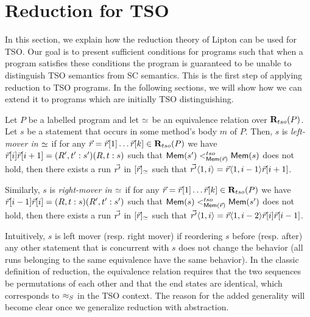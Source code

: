 \section{Reduction for TSO}
\label{sec:reduction-for-tso}
In this section, we explain how the reduction theory of Lipton can be used for TSO.
Our goal is to present sufficient conditions for programs such that when a program satisfies these conditions the program is guaranteed to be unable to distinguish TSO semantics from SC semantics. 
This is the first step of applying reduction to TSO programs.
In the following sections, we will show how we can extend it to programs which are initially TSO distinguishing.

\begin{definition}[Movers]
\label{def:movers}
Let $P$ be a labelled program and let $\simeq$ be an equivalence relation over $\mathbf{R}_{tso}(P)$.
Let $s$ be a statement that occurs in some method's body $m$ of $P$.
Then, $s$ is {\em left-mover in $\simeq$} if for any $\vec{r}=\vec{r}[1]\ldots\vec{r}[k]\in\mathbf{R}_{tso}(P)$ we have $\vec{r}[i]\vec{r}[i+1]=(R',t':s')(R,t:s)$ such that $\mathsf{Mem}(s') <^{tso}_{\mathsf{Mem}(\vec{r})} \mathsf{Mem}(s)$ does not hold, then there exists a run $\vec{r'}$ in $[\vec{r}]_{\simeq}$ such that $\vec{r'}\langle 1,i\rangle=\vec{r}\langle 1,i-1\rangle \vec{r}[i+1]$.

Similarly, $s$ is {\em right-mover in $\simeq$} if for any $\vec{r}=\vec{r}[1]\ldots\vec{r}[k]\in\mathbf{R}_{tso}(P)$ we have $\vec{r}[i-1]\vec{r}[i]=(R,t:s)(R',t':s')$ such that $\mathsf{Mem}(s) <^{tso}_{\mathsf{Mem}(\vec{r})} \mathsf{Mem}(s')$ does not hold, then there exists a run $\vec{r'}$ in $[\vec{r}]_{\simeq}$ such that $\vec{r'}\langle 1,i\rangle=\vec{r}\langle 1,i-2\rangle \vec{r}[i]\vec{r}[i-1]$.
\end{definition}

Intuitively, $s$ is left mover (resp. right mover) if reordering $s$ before (resp. after) any other statement that is concurrent with $s$ does not change the behavior (all runs belonging to the same equivalence have the same behavior).
In the classic definition of reduction, the equivalence relation requires that the two sequences be permutations of each other and that the end states are identical, which corresponds to $\approx_S$ in the TSO context.
The reason for the added generality will become clear once we generalize reduction with abstraction.

